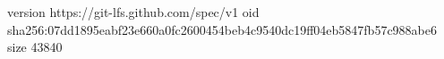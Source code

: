 version https://git-lfs.github.com/spec/v1
oid sha256:07dd1895eabf23e660a0fc2600454beb4c9540dc19ff04eb5847fb57c988abe6
size 43840
